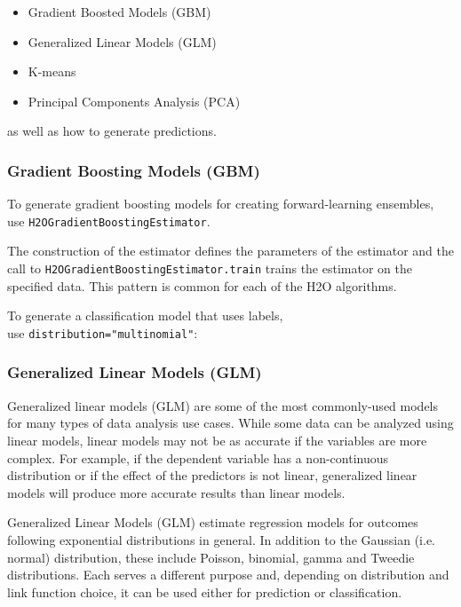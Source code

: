{\begin{itemize}
\item Gradient Boosted Models (GBM)
\item Generalized Linear Models (GLM)
\item K-means
\item Principal Components Analysis (PCA)

\end{itemize}
as well as how to generate predictions.

\subsubsection{Gradient Boosting Models (GBM)}
To generate gradient boosting models for creating forward-learning ensembles,
use {\texttt{H2OGradientBoostingEstimator}}.  

The construction of the estimator
defines the parameters of the estimator and the call to
{\texttt{H2OGradientBoostingEstimator.train}}  trains the estimator on
the specified data.  This pattern is common for each of the H2O algorithms.



To generate a classification model that uses labels, \\ use 
{\texttt{distribution="multinomial"}}:



\subsubsection{Generalized Linear Models (GLM)}
Generalized linear models (GLM) are some of the most commonly-used
models for many types of data analysis use cases. While some data
can be analyzed using linear models, linear models
may not be as accurate if the variables are more complex.
For example, if the dependent variable has a non-continuous
distribution or if the effect of the predictors is not linear,
generalized linear models will produce more accurate results than linear models.

Generalized Linear Models (GLM) estimate regression models for
outcomes following exponential distributions in general. In
addition to the Gaussian (i.e. normal) distribution, these include
Poisson, binomial, gamma and Tweedie distributions. Each serves
a different purpose and, depending on distribution and link
function choice, it can be used either for prediction or
classification.

}
